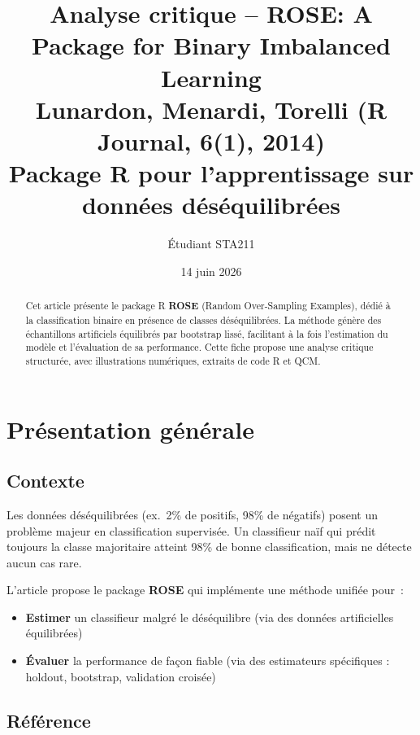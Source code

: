 \documentclass[a4paper,11pt]{article}
\title{\textbf{Analyse critique -- ROSE: A Package for Binary Imbalanced Learning}\\[4pt]
\large Lunardon, Menardi, Torelli (R Journal, 6(1), 2014)\\[2pt]
\small Package R pour l'apprentissage sur donn\'ees d\'es\'equilibr\'ees}
\author{\'Etudiant STA211}
\date{14 juin 2026}
\theoremstyle{definition}
\begin{document}
\maketitle
\thispagestyle{empty}

\begin{abstract}
Cet article pr\'esente le package R \textbf{ROSE} (Random Over-Sampling
Examples), d\'edi\'e \`a la classification binaire en pr\'esence de
classes d\'es\'equilibr\'ees. La m\'ethode g\'en\`ere des
\'echantillons artificiels \'equilibr\'es par bootstrap liss\'e,
facilitant \`a la fois l'estimation du mod\`ele et l'\'evaluation de
sa performance. Cette fiche propose une analyse critique structur\'ee,
avec illustrations num\'eriques, extraits de code R et
QCM.
\end{abstract}

\vfill
\tableofcontents
\newpage

\section{Pr\'esentation g\'en\'erale}

\subsection{Contexte}

Les donn\'ees d\'es\'equilibr\'ees (ex.~2\% de positifs, 98\% de
n\'egatifs) posent un probl\`eme majeur en classification supervis\'ee.
Un classifieur na\"if qui pr\'edit toujours la classe majoritaire
atteint 98\% de bonne classification, mais ne d\'etecte aucun cas rare.

L'article propose le package \textbf{ROSE} qui impl\'emente une
m\'ethode unifi\'ee pour~:
\begin{itemize}
  \item \textbf{Estimer} un classifieur malgr\'e le d\'es\'equilibre
    (via des donn\'ees artificielles \'equilibr\'ees)
  \item \textbf{\'Evaluer} la performance de fa\c con fiable
    (via des estimateurs sp\'ecifiques : holdout, bootstrap,
    validation crois\'ee)
\end{itemize}

\subsection{R\'ef\'erence}
\end{document}

